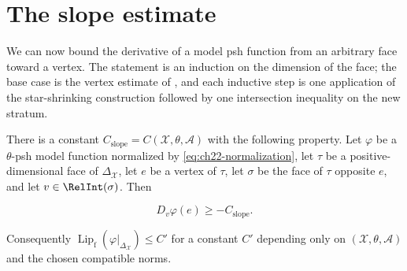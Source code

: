 \section{The slope estimate}
\label{sec:ch22-slope}

We can now bound the derivative of a model psh function from an arbitrary
face toward a vertex.  The statement is an induction on the dimension of the
face; the base case is the vertex estimate of
, and each inductive step is one application
of the star-shrinking construction followed by one intersection inequality
on the new stratum.

\begin{proposition}
\label{prop:ch22-slope-estimate}
There is a constant $C_{\mathrm{slope}}=C(\mathcal X,\theta,\mathcal A)$
with the following property.  Let $\varphi$ be a $\theta$-psh model
function normalized by \eqref{eq:ch22-normalization}, let $\tau$ be a
positive-dimensional face of $\Delta_{\mathcal X}$, let $e$ be a vertex
of $\tau$, let $\sigma$
be the face of $\tau$ opposite $e$, and let $v\in\RelInt(\sigma)$.
Then

\[
                    D_v\varphi(e)\geq-C_{\mathrm{slope}} .
\tag{22.43}\label{eq:ch22-slope-lower-bound}
\]

Consequently $\operatorname{Lip}_{\mathrm f}(\varphi|_{\Delta_{\mathcal X}})
\leq C'$ for a constant $C'$ depending only on
$(\mathcal X,\theta,\mathcal A)$ and the chosen compatible norms.
\end{proposition}

